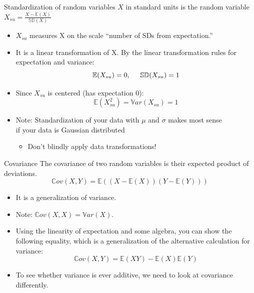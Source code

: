 \documentclass[aspectratio=169]{../latex_main/tntbeamer}  %
\begin{document}
	
	\begin{frame}[c]{Standardization of random variables}
	   $X$ in standard units is the random variable $X_{su} = \frac{X- \mathbb{E}(X)}{\mathbb{SD}(X)}$
	   \begin{itemize}
	       \item $X_{su}$ measures X on the scale “number of SDs from expectation.”
	       \item It is a linear transformation of X. By the linear transformation rules for expectation and variance:
	       \begin{equation*}
	           \mathbb{E}(X_{su})  = 0, \hspace{5mm} \mathbb{SD}(X_{su}) = 1
	       \end{equation*}
	       \item Since $X_{su}$ is centered (has expectation 0):
	       \begin{equation*}
	           \mathbb{E}(X^2_{su}) = \mathbb{V}ar(X_{su}) = 1
	       \end{equation*}
	       
	       \item \alert{Note}: Standardization of your data with $\mu$ and $\sigma$ makes most sense\\ if your data is Gaussian distributed
	       \begin{itemize}
	           \item Don't blindly apply data transformations! 
	       \end{itemize}
	       
	   \end{itemize}
	\end{frame}
	
	\begin{frame}[c]{Covariance}
	   The covariance of two random variables is their expected product of deviations.
	   \begin{equation*}
	       \mathbb{C}ov(X,Y) = \mathbb{E}((X-\mathbb{E}(X))(Y-\mathbb{E}(Y)))
	   \end{equation*}
	   \begin{itemize}
	       \item It is a generalization of variance. 
	       \item Note: $\mathbb{C}ov(X,X) = \mathbb{V}ar(X)$.   
	       \item Using the linearity of expectation and some algebra, you can show the following equality, which is a generalization of the alternative calculation for variance:
	       \begin{equation*}
	           \mathbb{C}ov(X,Y) = \mathbb{E}(XY) - \mathbb{E}(X)\mathbb{E}(Y)
	       \end{equation*}
	       \item To see whether variance is ever additive, we need to look at covariance differently.
	   \end{itemize}
	\end{frame}
	
\end{document}
